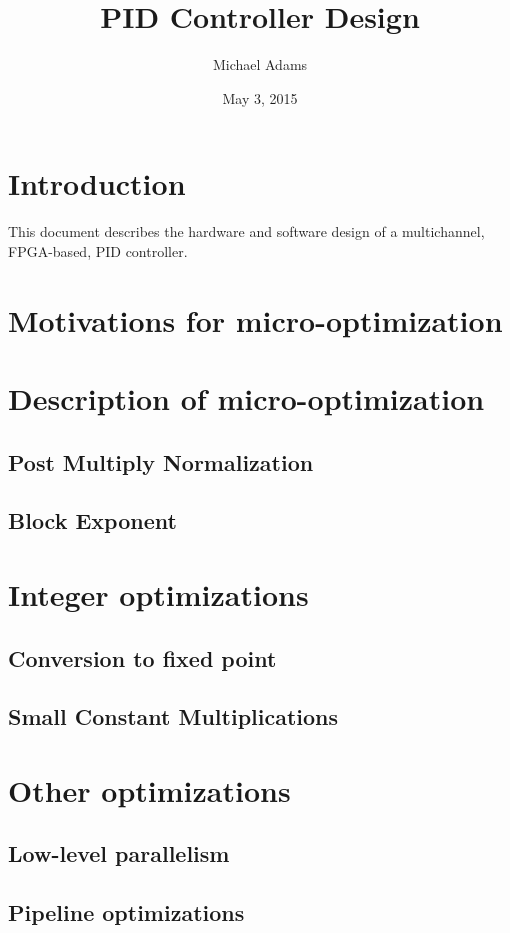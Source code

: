 \documentclass[11pt]{article}
\title{PID Controller Design}
\author{Michael Adams}
\date{May 3, 2015}
\begin{document}
\maketitle

\section{Introduction}

This document describes the hardware and software design of a multichannel, FPGA-based, PID controller. 

\section{Motivations for micro-optimization}

\section{Description of micro-optimization}

\subsection{Post Multiply Normalization}

\subsection{Block Exponent}

\section{Integer optimizations}

\subsection{Conversion to fixed point}

\subsection{Small Constant Multiplications}

\section{Other optimizations}

\subsection{Low-level parallelism}

\subsection{Pipeline optimizations}
\end{document}
